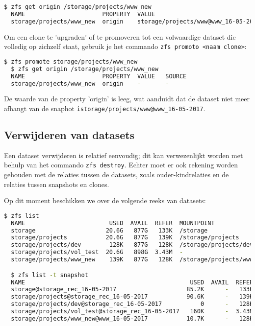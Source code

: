 \begin{lstlisting}[language=bash,style=command_style] 
  $ zfs get origin /storage/projects/www_new
  NAME                      PROPERTY  VALUE                                SOURCE
  storage/projects/www_new  origin    storage/projects/www@www_16-05-2017  -
\end{lstlisting}

Om een clone te 'upgraden' of te promoveren tot een volwaardige dataset die volledig op zichzelf staat, gebruik je het commando \texttt{zfs promoto <naam clone>}:

\begin{lstlisting}[language=bash,style=command_style] 
  $ zfs promote storage/projects/www_new
  $ zfs get origin /storage/projects/www_new
  NAME                      PROPERTY  VALUE   SOURCE
  storage/projects/www_new  origin    -       -
\end{lstlisting}

De waarde van de property 'origin' is leeg, wat aanduidt dat de dataset niet meer afhangt van de snaphot \texttt{istorage/projects/www@www\_16-05-2017}. 

\clearpage

\subsection{Verwijderen van datasets}

Een dataset verwijderen is relatief eenvoudig; dit kan verwezenlijkt worden met behulp van het commando \texttt{zfs destroy}. Echter moet er ook rekening worden gehouden met de relaties tussen de datasets, zoals ouder-kindrelaties en de relaties tussen snapshots en clones.

Op dit moment beschikken we over de volgende reeks van datasets:

\begin{lstlisting}[language=bash,style=command_style] 
  $ zfs list
  NAME                        USED  AVAIL  REFER  MOUNTPOINT
  storage                    20.6G   877G   133K  /storage
  storage/projects           20.6G   877G   139K  /storage/projects
  storage/projects/dev        128K   877G   128K  /storage/projects/dev
  storage/projects/vol_test  20.6G   898G  3.43M  -
  storage/projects/www_new    139K   877G   128K  /storage/projects/www_new

  $ zfs list -t snapshot
  NAME                                               USED  AVAIL  REFER  MOUNTPOINT
  storage@storage_rec_16-05-2017                    85.2K      -   133K  -
  storage/projects@storage_rec_16-05-2017           90.6K      -   139K  -
  storage/projects/dev@storage_rec_16-05-2017           0      -   128K  -
  storage/projects/vol_test@storage_rec_16-05-2017   160K      -  3.43M  -
  storage/projects/www_new@www_16-05-2017           10.7K      -   128K  -
\end{lstlisting}

